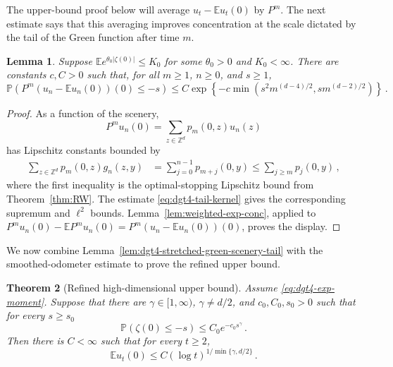 \documentclass[11pt]{amsart}
\theoremstyle{plain}
\newtheorem{theorem}{Theorem}[section]
\newtheorem{lemma}[theorem]{Lemma}
\theoremstyle{definition}
\newcommand{\Z}{\mathbb{Z}}
\newcommand{\E}{\mathbb{E}}
\renewcommand{\P}{\mathbb{P}}
\begin{document}
		The upper-bound proof below will average $u_t-\E u_t(0)$ by $P^m$.
		The next estimate says that this averaging improves concentration at the
		scale dictated by the tail of the Green function after time $m$.

		\begin{lemma}\label{lem:dgt4-smoothed-odometer-tail}
			Suppose $\E e^{\theta_0|\zeta(0)|}\leq K_0$ for some $\theta_0>0$ and
			$K_0<\infty$. There are constants $c,C>0$ such that, for all
			$m\geq1$, $n\geq0$, and $s\geq1$,
				\[
					\P\left(P^m(u_n-\E u_n(0))(0)\leq -s\right)
					\leq
					C\exp\left\{
					-c\min\left(s^2m^{(d-4)/2}, s m^{(d-2)/2}\right)
					\right\}\, .
			\]
		\end{lemma}

		\begin{proof}
			As a function of the scenery,
				\[
					P^m u_n(0)=\sum_{z\in\Z^d}p_m(0,z)u_n(z)
				\]
			has Lipschitz constants bounded by
			\[
			\begin{aligned}
				\sum_{z\in\Z^d}p_m(0,z)g_n(z,y)
				&=
				\sum_{j=0}^{n-1}p_{m+j}(0,y)
				\leq
				\sum_{j\geq m}p_j(0,y)\, ,
			\end{aligned}
			\]
			where the first inequality is the optimal-stopping Lipschitz bound
			from Theorem~\ref{thm:RW}. The estimate
			\eqref{eq:dgt4-tail-kernel} gives the corresponding supremum and
			$\ell^2$ bounds.
			Lemma~\ref{lem:weighted-exp-conc}, applied to
			$P^m u_n(0)-\E P^m u_n(0)=P^m(u_n-\E u_n(0))(0)$, proves the
			display.  
		\end{proof}

		We now combine Lemma~\ref{lem:dgt4-stretched-green-scenery-tail} with
		the smoothed-odometer estimate to prove the refined upper bound.

		\begin{theorem}[Refined high-dimensional upper bound]
		\label{thm:dgt4-height-upper-tail}
			Assume \eqref{eq:dgt4-exp-moment}. Suppose that there are
			$\gamma\in[1,\infty)$, $\gamma\ne d/2$, and $c_0,C_0,s_{0}>0$ such that for every $s\geq s_{0}$
			\[
				\P(\zeta(0)\leq -s)\leq C_0e^{-c_0s^\gamma}\, .
			\]
			Then there is $C<\infty$ such that for every $t\geq 2$,
			\[
				\E u_t(0)\leq C(\log t)^{1/\min\{\gamma,d/2\}}\, .
			\]
		\end{theorem}
\end{document}
